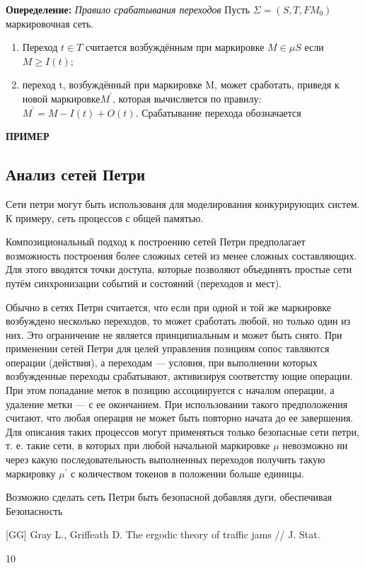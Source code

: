 \documentclass[a4paper,14pt]{article}
\begin{document}
\textbf{Опеределение: } \textit{Правило срабатывания переходов}
Пусть $\Sigma = (S,T,F M_{0})$ маркировочная сеть.
\begin{enumerate}
\item Переход $t \in T$ считается возбуждённым при маркировке $M \in \mu S$ если $M \geq I(t)$;
\item переход t, возбуждённый при маркировке M,  может сработать, приведя к новой маркировке$M^{'}$,  которая вычисляется по правилу: $M^{'} = M - I(t) + O(t)$. Срабатывание перехода обозначается 
\end{enumerate}


\textbf{ПРИМЕР}

\subsection{Анализ сетей Петри}
Сети петри могут быть использованя для моделирования конкурирующих систем. К примеру, сеть процессов с общей памятью. 

\par Композициональный подход к построению сетей Петри предполагает возможность построения более сложных сетей из менее сложных составляющих. Для этого вводятся точки доступа, которые позволяют объединять простые сети путём синхронизации событий и состояний (переходов и мест).
\par Обычно в сетях Петри считается, что если при одной и той же маркировке возбуждено несколько переходов, то может сработать любой, но только один из них. Это ограничение не является принципиальным и может быть снято.
При применении сетей Петри для целей управления позициям сопос­
тавляются операции (действия), а переходам — условия, при выполнении
которых возбужденные переходы срабатывают, активизируя соответству­ ющие операции. При этом попадание меток в позицию ассоциируется с началом операции, а удаление метки — с ее окончанием. При использовании такого предположения считают, что любая операция не может быть повторно начата до ее завершения. Для описания таких процессов могут применяться только безопасные сети петри, т. е. такие сети, в которых при любой начальной маркировке $\mu$ невозможно ни через какую последовательность выполненных переходов получить такую маркировку $\mu^{'}$ с количеством токенов в положении больше единицы.
\par Возможно сделать сеть Петри быть безопасной добавляя дуги, обеспечивая 
Безопасность 







\begin{thebibliography}{10}
[GG] Gray L., Griffeath D. The ergodic theory of traffic jams // J. Stat. 
\end{thebibliography}{10}
\end{document}
